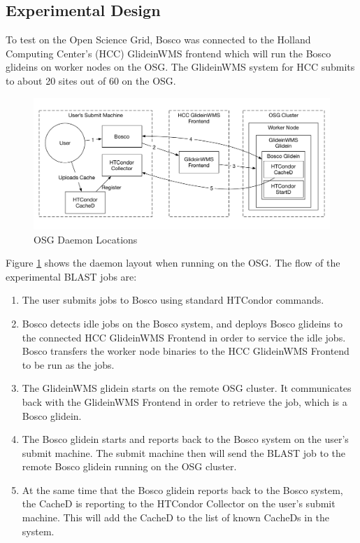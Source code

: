 \subsection{Experimental Design}
To test on the Open Science Grid, Bosco was connected to the Holland Computing Center's (HCC) GlideinWMS frontend which will run the Bosco glideins on worker nodes on the OSG.  The GlideinWMS system for HCC submits to about 20 sites out of 60 on the OSG.

\begin{figure}[ht]
	\centering
	\includegraphics[width=\textwidth]{images/OSGDaemonLayout.pdf}
	\caption{OSG Daemon Locations}
	\label{fig:osgdaemonlayoutcached}
\end{figure}

Figure \ref{fig:osgdaemonlayoutcached} shows the daemon layout when running on the OSG.  The flow of the experimental BLAST jobs are:

\begin{enumerate}
	\item The user submits jobs to Bosco using standard HTCondor commands.
	
	\item Bosco detects idle jobs on the Bosco system, and deploys Bosco glideins to the connected HCC GlideinWMS Frontend in order to service the idle jobs.  Bosco transfers the worker node binaries to the HCC GlideinWMS Frontend to be run as the jobs.
	
	\item The GlideinWMS glidein starts on the remote OSG cluster.  It communicates back with the GlideinWMS Frontend in order to retrieve the job, which is a Bosco glidein.
	
	\item The Bosco glidein starts and reports back to the Bosco system on the user's submit machine.  The submit machine then will send the BLAST job to the remote Bosco glidein running on the OSG cluster.
	
	\item At the same time that the Bosco glidein reports back to the Bosco system, the CacheD is reporting to the HTCondor Collector on the user's submit machine.  This will add the CacheD to the list of known CacheDs in the system.
\end{enumerate}

